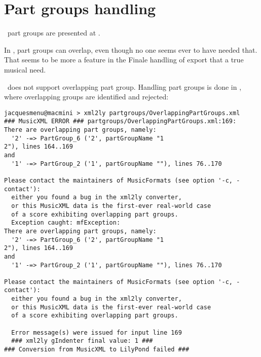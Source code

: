 
\chapter{Part groups handling}\label{Part groups handling}

\mf\ part groups are presented at .

In \mxml, part groups can overlap, even though no one seems ever to have needed that. That seems to be more a feature in the Finale handling of \mxml export that a true musical need.

\msrRepr\ does not support overlapping part group. Handling part groups is done in , where overlapping groups are identified and rejected:
\begin{lstlisting}[language=Terminal]
jacquesmenu@macmini > xml2ly partgroups/OverlappingPartGroups.xml
### MusicXML ERROR ### partgroups/OverlappingPartGroups.xml:169:
There are overlapping part groups, namely:
  '2' -=> PartGroup_6 ('2', partGroupName "1
2"), lines 164..169
and
  '1' -=> PartGroup_2 ('1', partGroupName ""), lines 76..170

Please contact the maintainers of MusicFormats (see option '-c, -contact'):
  either you found a bug in the xml2ly converter,
  or this MusicXML data is the first-ever real-world case
  of a score exhibiting overlapping part groups.
  Exception caught: mfException:
There are overlapping part groups, namely:
  '2' -=> PartGroup_6 ('2', partGroupName "1
2"), lines 164..169
and
  '1' -=> PartGroup_2 ('1', partGroupName ""), lines 76..170

Please contact the maintainers of MusicFormats (see option '-c, -contact'):
  either you found a bug in the xml2ly converter,
  or this MusicXML data is the first-ever real-world case
  of a score exhibiting overlapping part groups.

  Error message(s) were issued for input line 169
  ### xml2ly gIndenter final value: 1 ###
### Conversion from MusicXML to LilyPond failed ###
\end{lstlisting}

